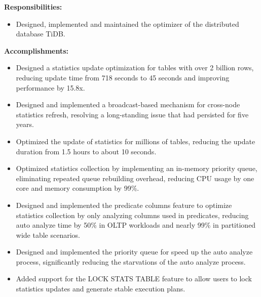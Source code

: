 \documentclass{software_engineer_dongpo_liu}
\newcommand{\en}[1]{#1}
\newcommand{\zh}[1]{}
\begin{document}
\en{\textbf{Responsibilities:}}
\zh{\textbf{职责：}}
\begin{itemize}
      \item \en{Designed, implemented and maintained the optimizer of the distributed database TiDB.}
      \zh{设计、实现和维护分布式数据库 TiDB 的优化器。}
\end{itemize}

\en{\textbf{Accomplishments:}}
\zh{\textbf{产出：}}
\begin{itemize}
      \item \en{Designed a statistics update optimization for tables with over 2 billion rows, reducing update time from 718 seconds to 45 seconds and improving performance by 15.8x.}
      \zh{设计统计信息更新优化方案，将 20 亿行以上表的统计信息更新耗时从 718 秒降至 45 秒，性能提升 15.8 倍。}
      \item \en{Designed and implemented a broadcast-based mechanism for cross-node statistics refresh, resolving a long-standing issue that had persisted for five years.}
      \zh{设计并实现基于广播机制的跨节点统计信息刷新方案，解决了持续 5 年的历史遗留问题。}
      \item \en{Optimized the update of statistics for millions of tables, reducing the update duration from 1.5 hours to about 10 seconds.}
      \zh{优化了百万张表的统计信息更新，将更新延迟从 1.5 小时缩短至约 10 秒。}
      \item \en{Optimized statistics collection by implementing an in-memory priority queue, eliminating repeated queue rebuilding overhead, reducing CPU usage by one core and memory consumption by 99\%.}
      \zh{通过实现内存中的优先级队列优化统计信息收集，消除重复队列重建开销，减少一个 CPU 核心使用率并降低 99\% 内存消耗。}
      \item \en{Designed and implemented the predicate columns feature to optimize statistics collection by only analyzing columns used in predicates, reducing auto analyze time by 50\% in OLTP workloads and nearly 99\% in partitioned wide table scenarios.}
      \zh{设计和实现了 predicate columns 功能，通过只分析谓词中使用的列来优化统计信息收集，在 OLTP 工作负载下将自动分析时间减少了 50\%，在分区宽表场景下提升近 99\%。}
      \item \en{Designed and implemented the priority queue for speed up the auto analyze process, significantly reducing the starvations of the auto analyze process.}
      \zh{设计并实现了优先级队列，加速了自动分析过程，极大的减少了自动分析过程的饥饿现象。}
      \item \en{Added support for the LOCK STATS TABLE feature to allow users to lock statistics updates and generate stable execution plans.}
      \zh{添加 LOCK STATS TABLE 功能，方便用户锁定统计信息的更新，生成稳定的执行计划。}
\end{itemize}
\end{document}
